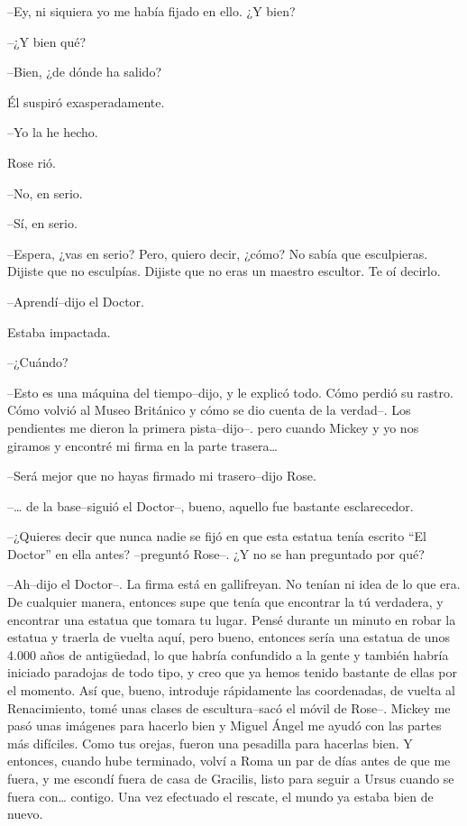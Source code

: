 --Ey, ni siquiera yo me había fijado en ello. ¿Y bien?

--¿Y bien qué?

--Bien, ¿de dónde ha salido?

Él suspiró exasperadamente.

--Yo la he hecho.

Rose rió.

--No, en serio.

--Sí, en serio.

--Espera, ¿vas en serio? Pero, quiero decir, ¿cómo? No sabía que
esculpieras. Dijiste que no esculpías. Dijiste que no eras un maestro
escultor. Te oí decirlo.

--Aprendí--dijo el Doctor.

Estaba impactada.

--¿Cuándo?

--Esto es una máquina del tiempo--dijo, y le explicó todo. Cómo perdió
su rastro. Cómo volvió al Museo Británico y cómo se dio cuenta de la
verdad--. Los pendientes me dieron la primera pista--dijo--. pero cuando
Mickey y yo nos giramos y encontré mi firma en la parte trasera\ldots{}

--Será mejor que no hayas firmado mi trasero--dijo Rose.

--\ldots{} de la base--siguió el Doctor--, bueno, aquello fue bastante
esclarecedor.

--¿Quieres decir que nunca nadie se fijó en que esta estatua tenía
escrito ``El Doctor'' en ella antes? --preguntó Rose--. ¿Y no se han
preguntado por qué?

--Ah--dijo el Doctor--. La firma está en gallifreyan. No tenían ni idea
de lo que era. De cualquier manera, entonces supe que tenía que
encontrar la tú verdadera, y encontrar una estatua que tomara tu lugar.
Pensé durante un minuto en robar la estatua y traerla de vuelta aquí,
pero bueno, entonces sería una estatua de unos 4.000 años de antigüedad,
lo que habría confundido a la gente y también habría iniciado paradojas
de todo tipo, y creo que ya hemos tenido bastante de ellas por el
momento. Así que, bueno, introduje rápidamente las coordenadas, de
vuelta al Renacimiento, tomé unas clases de escultura--sacó el móvil de
Rose--. Mickey me pasó unas imágenes para hacerlo bien y Miguel Ángel me
ayudó con las partes más difíciles. Como tus orejas, fueron una
pesadilla para hacerlas bien. Y entonces, cuando hube terminado, volví a
Roma un par de días antes de que me fuera, y me escondí fuera de casa de
Gracilis, listo para seguir a Ursus cuando se fuera con\ldots{} contigo.
Una vez efectuado el rescate, el mundo ya estaba bien de nuevo.

